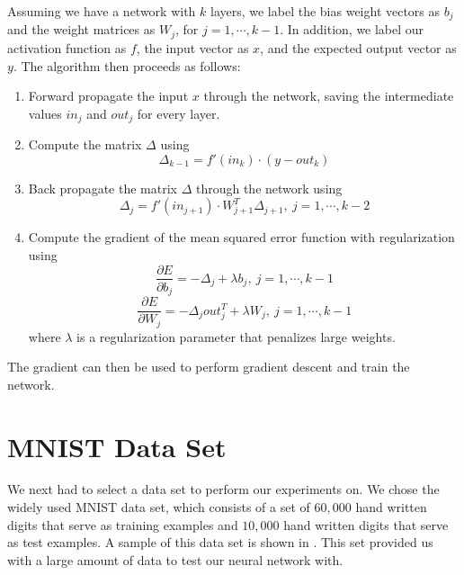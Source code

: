 \documentclass[journal,hidelinks]{IEEEtran}
\begin{document}
Assuming we have a network with $k$ layers, we label the bias weight vectors as $b_j$ and the weight matrices as $W_j$, for $j = 1, \cdots, k-1$. In addition, we label our activation function as $f$, the input vector as $x$, and the expected output vector as $y$. The algorithm then proceeds as follows:
\begin{enumerate}
  \item Forward propagate the input $x$ through the network, saving the intermediate values $in_j$ and $out_j$ for every layer.
  \item Compute the matrix $\Delta$ using
    \begin{equation}
    \Delta_{k-1} = f'(in_k) \cdot (y - out_k)
    \end{equation}
  \item Back propagate the matrix $\Delta$ through the network using
    \begin{equation}
    \Delta_j = f'(in_{j+1}) \cdot W_{j+1}^T \Delta_{j+1}, \  j = 1, \cdots, k-2
    \end{equation}
  \item Compute the gradient of the mean squared error function with regularization using
    \begin{equation}
    \frac{\partial E}{\partial b_j} = -\Delta_j + \lambda b_j, \  j = 1, \cdots, k-1
    \end{equation}
    \begin{equation}
    \frac{\partial E}{\partial W_j} = -\Delta_j out_j^T + \lambda W_j, \  j = 1, \cdots, k-1
    \end{equation}
where $\lambda$ is a regularization parameter that penalizes large weights.
\end{enumerate}
The gradient can then be used to perform gradient descent and train the network.

\section{MNIST Data Set}

We next had to select a data set to perform our experiments on. We chose the widely used MNIST data set, which consists of a set of $60,000$ hand written digits that serve as training examples and $10,000$ hand written digits that serve as test examples. A sample of this data set is shown in . This set provided us with a large amount of data to test our neural network with.
\end{document}
